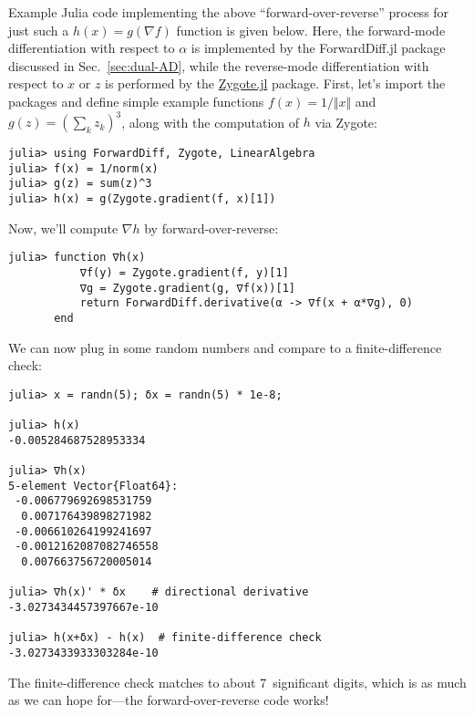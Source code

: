 Example Julia code implementing the above ``forward-over-reverse'' process for just such a $h(x)=g(\nabla f)$ function is given below.  Here, the forward-mode differentiation with respect to $\alpha$ is implemented by the ForwardDiff.jl package discussed in Sec.~\ref{sec:dual-AD}, while the reverse-mode differentiation with respect to $x$ or $z$ is performed by the \href{https://fluxml.ai/Zygote.jl/stable/}{Zygote.jl} package. First, let's import the packages and define simple example functions $f(x) = 1/\Vert x \Vert$ and $g(z) = (\sum_k z_k)^3$, along with the computation of $h$ via Zygote:
\begin{verbatim}
julia> using ForwardDiff, Zygote, LinearAlgebra
julia> f(x) = 1/norm(x)
julia> g(z) = sum(z)^3
julia> h(x) = g(Zygote.gradient(f, x)[1])
\end{verbatim}
Now, we'll compute $\nabla h$ by forward-over-reverse:
\begin{verbatim}
julia> function ∇h(x)
           ∇f(y) = Zygote.gradient(f, y)[1]
           ∇g = Zygote.gradient(g, ∇f(x))[1]
           return ForwardDiff.derivative(α -> ∇f(x + α*∇g), 0)
       end
\end{verbatim}
We can now plug in some random numbers and compare to a finite-difference check:
\begin{verbatim}
julia> x = randn(5); δx = randn(5) * 1e-8;

julia> h(x)
-0.005284687528953334

julia> ∇h(x)
5-element Vector{Float64}:
 -0.006779692698531759
  0.007176439898271982
 -0.006610264199241697
 -0.0012162087082746558
  0.007663756720005014

julia> ∇h(x)' * δx    # directional derivative
-3.0273434457397667e-10

julia> h(x+δx) - h(x)  # finite-difference check
-3.0273433933303284e-10
\end{verbatim}
The finite-difference check matches to about 7~significant digits, which is as much as we can hope for---the forward-over-reverse code works!

